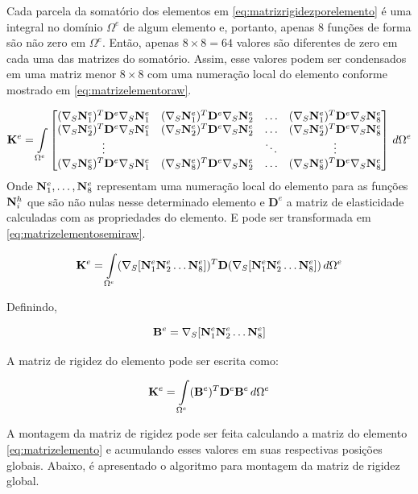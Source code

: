 Cada parcela da somatório dos elementos em \eqref{eq:matrizrigidezporelemento} é uma integral no domínio $\Omega^e$ de algum elemento e, portanto, apenas 8 funções de forma são não zero em $\Omega^e$. Então, apenas $8\times8=64$ valores são diferentes de zero em cada uma das matrizes do somatório. Assim, esse valores podem ser condensados em uma matriz menor $8\times8$ com uma numeração local do elemento conforme mostrado em \eqref{eq:matrizelementoraw}.

\begin{equation}\label{eq:matrizelementoraw}
\mathbf{K}^e =
\omeeint{
\begin{bmatrix}
\kije{1}{1} & \kije{1}{2}  & \hdots & \kije{1}{8}  \\
\kije{2}{1} & \kije{2}{2}  & \hdots & \kije{2}{8}  \\
\vdots      &              & \ddots & \vdots       \\
\kije{8}{1} & \kije{8}{2}  & \hdots & \kije{8}{8}
\end{bmatrix}
}
\end{equation}
Onde $\basefunctionelem[1], \hdots, \basefunctionelem[8]$ representam uma numeração local do elemento para as funções $\basefunctionfine$ que são não nulas nesse determinado elemento e $\mathbf{D}^e$ a matriz de elasticidade calculadas com as propriedades do elemento. E pode ser transformada em \eqref{eq:matrizelementosemiraw}.

\begin{equation}\label{eq:matrizelementosemiraw}
    \mathbf{K}^e =\omeeint{ (\sopnabla [\basefunctionelem[1] \basefunctionelem[2] \hdots \basefunctionelem[8] ]) ^T \mathbf{D} (\sopnabla [\basefunctionelem[1] \basefunctionelem[2] \hdots \basefunctionelem[8]])}
\end{equation}

Definindo,

\begin{equation}
    \mathbf{B}^e = \sopnabla [\basefunctionelem[1] \basefunctionelem[2] \hdots \basefunctionelem[8] ]
\end{equation}

A matriz de rigidez do elemento pode ser escrita como:

\begin{equation} \label{eq:matrizelemento}
    \mathbf{K}^e = \omeeint{(\mathbf{B}^e)^T \mathbf{D}^e \mathbf{B}^e}
\end{equation}


A montagem da matriz de rigidez pode ser feita calculando a matriz do elemento \eqref{eq:matrizelemento} e acumulando esses valores em suas respectivas posições globais. Abaixo, é apresentado  o algoritmo para montagem da matriz de rigidez global.

